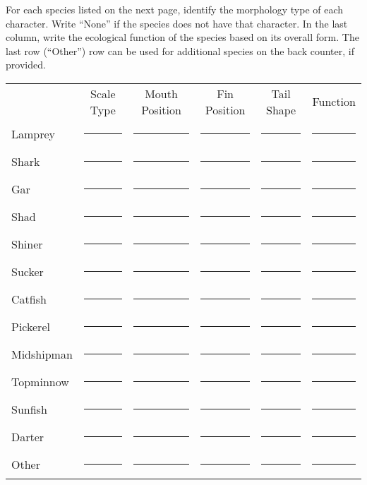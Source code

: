 \documentclass[11pt]{article}
\newcommand{\VSpace}{\vspace{\baselineskip}}
\begin{document}
\VSpace\VSpace
For each species listed on the next page, identify the morphology type of each character. Write “None” if the species does not have that character.  In the last column, write the ecological function of the species based on its overall form.  The last row (“Other”) row can be used for additional species on the back counter, if provided.

\newpage
{}
\begin{landscape}
\VSpace\centering
\noindent\begin{tabular}{@{}lccccc@{}}
	&	Scale Type	&	Mouth Position	&	Fin Position	&	Tail Shape	&	Function \\[2em]
Lamprey	& \rule{3cm}{0.4pt} & \rule{3cm}{0.4pt} & \rule{3cm}{0.4pt} & \rule{3cm}{0.4pt} & \rule{3cm}{0.4pt} \\[2em]
Shark	& \rule{3cm}{0.4pt} & \rule{3cm}{0.4pt} & \rule{3cm}{0.4pt} & \rule{3cm}{0.4pt} & \rule{3cm}{0.4pt} \\[2em]
Gar		& \rule{3cm}{0.4pt} & \rule{3cm}{0.4pt} & \rule{3cm}{0.4pt} & \rule{3cm}{0.4pt} & \rule{3cm}{0.4pt} \\[2em]
Shad		& \rule{3cm}{0.4pt} & \rule{3cm}{0.4pt} & \rule{3cm}{0.4pt} & \rule{3cm}{0.4pt} & \rule{3cm}{0.4pt} \\[2em]
Shiner	& \rule{3cm}{0.4pt} & \rule{3cm}{0.4pt} & \rule{3cm}{0.4pt} & \rule{3cm}{0.4pt} & \rule{3cm}{0.4pt} \\[2em]
Sucker	& \rule{3cm}{0.4pt} & \rule{3cm}{0.4pt} & \rule{3cm}{0.4pt} & \rule{3cm}{0.4pt} & \rule{3cm}{0.4pt} \\[2em]
Catfish	& \rule{3cm}{0.4pt} & \rule{3cm}{0.4pt} & \rule{3cm}{0.4pt} & \rule{3cm}{0.4pt} & \rule{3cm}{0.4pt} \\[2em]
Pickerel	& \rule{3cm}{0.4pt} & \rule{3cm}{0.4pt} & \rule{3cm}{0.4pt} & \rule{3cm}{0.4pt} & \rule{3cm}{0.4pt} \\[2em]
Midshipman	& \rule{3cm}{0.4pt} & \rule{3cm}{0.4pt} & \rule{3cm}{0.4pt} & \rule{3cm}{0.4pt} & \rule{3cm}{0.4pt} \\[2em]
Topminnow	& \rule{3cm}{0.4pt} & \rule{3cm}{0.4pt} & \rule{3cm}{0.4pt} & \rule{3cm}{0.4pt} & \rule{3cm}{0.4pt} \\[2em]
Sunfish	& \rule{3cm}{0.4pt} & \rule{3cm}{0.4pt} & \rule{3cm}{0.4pt} & \rule{3cm}{0.4pt} & \rule{3cm}{0.4pt} \\[2em]
Darter	& \rule{3cm}{0.4pt} & \rule{3cm}{0.4pt} & \rule{3cm}{0.4pt} & \rule{3cm}{0.4pt} & \rule{3cm}{0.4pt} \\[2em]
Other	& \rule{3cm}{0.4pt} & \rule{3cm}{0.4pt} & \rule{3cm}{0.4pt} & \rule{3cm}{0.4pt} & \rule{3cm}{0.4pt} \\
\end{tabular}
\end{landscape}
\end{document}

